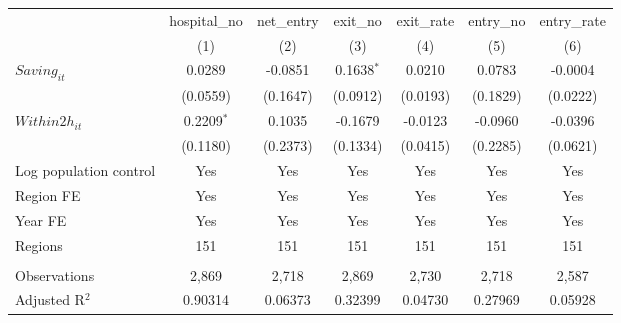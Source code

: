 \begingroup
\centering
\begin{tabular}{lcccccc}
   \toprule
                          & hospital\_no  & net\_entry  & exit\_no     & exit\_rate  & entry\_no  & entry\_rate \\    
                          & (1)           & (2)         & (3)          & (4)         & (5)        & (6)\\  
   \midrule 
   $Saving_{it}$          & 0.0289        & -0.0851     & 0.1638$^{*}$ & 0.0210      & 0.0783     & -0.0004\\   
                          & (0.0559)      & (0.1647)    & (0.0912)     & (0.0193)    & (0.1829)   & (0.0222)\\   
   $Within2h_{it}$        & 0.2209$^{*}$  & 0.1035      & -0.1679      & -0.0123     & -0.0960    & -0.0396\\   
                          & (0.1180)      & (0.2373)    & (0.1334)     & (0.0415)    & (0.2285)   & (0.0621)\\   
   Log population control & Yes           & Yes         & Yes          & Yes         & Yes        & Yes\\  
   Region FE              & Yes           & Yes         & Yes          & Yes         & Yes        & Yes\\  
   Year FE                & Yes           & Yes         & Yes          & Yes         & Yes        & Yes\\  
   Regions                & 151           & 151         & 151          & 151         & 151        & 151\\  
    \\
   Observations           & 2,869         & 2,718       & 2,869        & 2,730       & 2,718      & 2,587\\  
   Adjusted R$^2$         & 0.90314       & 0.06373     & 0.32399      & 0.04730     & 0.27969    & 0.05928\\  
   \bottomrule
\end{tabular}
\par\endgroup
